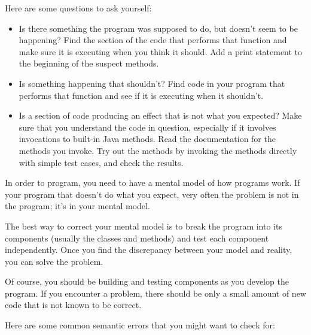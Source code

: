 \documentclass{book}
\begin{document}
Here are some questions to ask yourself:

\begin{itemize}

\item Is there something the program was supposed to do, but
doesn't seem to be happening?  Find the section of the code
that performs that function and make sure it is executing when
you think it should.  Add a print statement to the beginning
of the suspect methods.

\item Is something happening that shouldn't?  Find code in
your program that performs that function and see if it is
executing when it shouldn't.

\item Is a section of code producing an effect that is not
what you expected?  Make sure that you understand the code in
question, especially if it involves invocations to built-in
Java methods.  Read the documentation for the methods you invoke.
Try out the methods by invoking the methods directly with
simple test cases, and check the results.

\end{itemize}

In order to program, you need to have a mental model of how
programs work.  If your program that doesn't do what you expect,
very often the problem is not in the program; it's in your mental
model.


The best way to correct your mental model is to break the program
into its components (usually the classes and methods) and test
each component independently.  Once you find the discrepancy
between your model and reality, you can solve the problem.

Of course, you should be building and testing components as you
develop the program.  If you encounter a problem, there should be only
a small amount of new code that is not known to be correct.

Here are some common semantic errors that you might want to check for:
\end{document}
